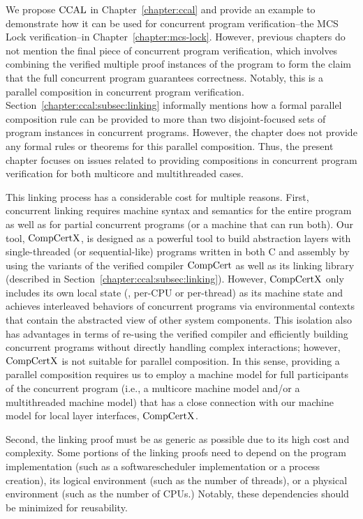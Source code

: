  We propose $\mathrm{CCAL}$ in Chapter~\ref{chapter:ccal} and
provide an example to demonstrate how it can be used for concurrent program verification--the MCS Lock verification--in Chapter~\ref{chapter:mcs-lock}.
However, previous chapters do not mention the final piece of concurrent program verification, 
which involves combining the verified multiple proof instances of the program to form the claim that the full concurrent program guarantees correctness. Notably, this is a parallel composition in concurrent program verification. 
Section~\ref{chapter:ccal:subsec:linking}
informally mentions how a formal parallel composition rule can be provided to more than two disjoint-focused sets of program instances in concurrent programs.
However, the chapter does not provide any formal rules or theorems for this parallel composition. 
Thus, the present chapter focuses on issues related to providing compositions in concurrent program verification for both multicore and multithreaded cases.


This linking process has a considerable cost for multiple reasons. 
First, concurrent linking requires machine syntax and semantics for the entire program as well as for partial concurrent programs 
(or a machine that can run both). 
Our tool, $\mathrm{CompCertX}$, is designed as a powerful tool to build abstraction layers with single-threaded (or sequential-like) programs written in both C and assembly by using the variants of the verified compiler $\mathrm{CompCert}$ as well as its linking library (described in Section~\ref{chapter:ccal:subsec:linking}). However, $\mathrm{CompCertX}$ only includes its own local state (\ie, per-CPU or per-thread) as its machine state and achieves interleaved behaviors of concurrent programs via environmental contexts that contain the abstracted view of other system components. 
This isolation also has advantages in terms of re-using the verified compiler and efficiently building concurrent programs without directly handling complex interactions; however, $\mathrm{CompCertX}$ is not suitable for parallel composition. 
In this sense, providing a parallel composition requires us to employ a machine model for full participants of the concurrent program (i.e., a multicore machine model and/or a multithreaded machine model) that has a close connection with our machine model for  local layer interfaces, $\mathrm{CompCertX}$.

Second, the linking proof must be as generic as possible due to its high cost and complexity.
Some portions of the linking proofs need to depend on the program implementation (such as a softwarescheduler implementation or a process creation), its logical environment (such as the number of threads), or a physical environment (such as the number of CPUs.) 
Notably, these dependencies should be minimized for reusability.

